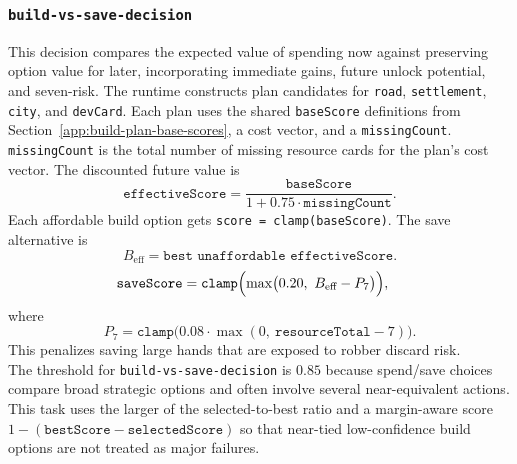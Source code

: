 \documentclass{article}
\begin{document}
\subsubsection{\texttt{build-vs-save-decision}}
\label{app:task-build-vs-save-decision}
This decision compares the expected value of spending now against preserving option value for later, incorporating immediate gains, future unlock potential, and seven-risk.
The runtime constructs plan candidates for \texttt{road}, \texttt{settlement}, \texttt{city}, and \texttt{devCard}. Each plan uses the shared \texttt{baseScore} definitions from Section~\ref{app:build-plan-base-scores}, a cost vector, and a \texttt{missingCount}. \texttt{missingCount} is the total number of missing resource cards for the plan's cost vector. The discounted future value is
\[
\texttt{effectiveScore} = \frac{\texttt{baseScore}}{1 + 0.75 \cdot \texttt{missingCount}}.
\]
Each affordable build option gets \texttt{score = clamp(baseScore)}. The save alternative is
\[
B_{\text{eff}} = \texttt{best unaffordable effectiveScore}.
\]
\[
\begin{aligned}
\texttt{saveScore}
&= \texttt{clamp}\Bigl(
\max\bigl(0.20,\ B_{\text{eff}} - P_7\bigr)
\Bigr),
\end{aligned}
\]
where
\[
P_7 = \texttt{clamp}\bigl(0.08 \cdot \max(0,\ \texttt{resourceTotal}-7)\bigr).
\]
This penalizes saving large hands that are exposed to robber discard risk.
\\
The threshold for \texttt{build-vs-save-decision} is $0.85$ because spend/save choices compare broad strategic options and often involve several near-equivalent actions. This task uses the larger of the selected-to-best ratio and a margin-aware score $1-(\texttt{bestScore}-\texttt{selectedScore})$ so that near-tied low-confidence build options are not treated as major failures.
\end{document}
